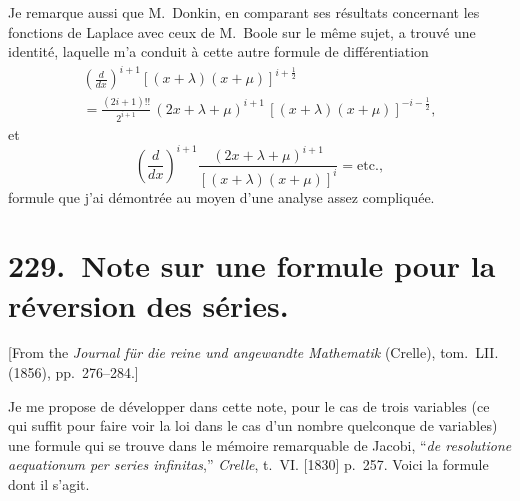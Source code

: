\documentclass[11pt,a4paper]{book}
\theoremstyle{plain}
\begin{document}
Je remarque aussi que M.~Donkin, en comparant ses r\'{e}sultats concernant les fonctions de Laplace avec ceux de M.~Boole sur le m\^{e}me sujet, a trouv\'{e} une identit\'{e}, laquelle m'a conduit \`{a} cette autre formule de diff\'{e}rentiation
\begin{multline}
\left(\frac{d}{dx}\right)^{i+1}[(x+\lambda)(x+\mu)]^{i+\frac{1}{2}}\\
=\frac{(2i+1)!!}{2^{i+1}}\,(2x+\lambda+\mu)^{i+1}\,[(x+\lambda)(x+\mu)]^{-i-\frac{1}{2}},
\end{multline}
et
\begin{equation}
\left(\frac{d}{dx}\right)^{i+1}\frac{(2x+\lambda+\mu)^{i+1}}{[(x+\lambda)(x+\mu)]^{i}}=\text{etc.},
\end{equation}
formule que j'ai d\'{e}montr\'{e}e au moyen d'une analyse assez compliqu\'{e}e.
\newpage

\chapter[Note sur une formule pour la r\'{e}version des s\'{e}ries]{229.\ Note sur une formule pour la r\'{e}version des s\'{e}ries.}
\label{paper229}

\begin{center}
\small
[From the \textit{Journal f\"{u}r die reine und angewandte Mathematik} (Crelle), tom.~LII. (1856), pp.~276--284.]
\end{center}

\bigskip

Je me propose de d\'{e}velopper dans cette note, pour le cas de trois variables (ce qui suffit pour faire voir la loi dans le cas d'un nombre quelconque de variables) une formule qui se trouve dans le m\'{e}moire remarquable de Jacobi, ``\textit{de resolutione aequationum per series infinitas},'' \textit{Crelle}, t.~VI. [1830] p.~257. Voici la formule dont il s'agit.
\end{document}
